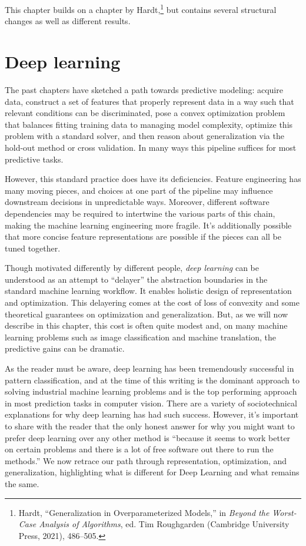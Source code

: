 \documentclass{tufte-book}
\begin{document}
This chapter builds on a chapter by Hardt,\footnote{Hardt,
  {``Generalization in Overparameterized Models,''} in \emph{Beyond the
  Worst-Case Analysis of Algorithms}, ed. Tim Roughgarden (Cambridge
  University Press, 2021), 486--505.} but contains several structural
changes as well as different results.

\chapter{Deep learning}

The past chapters have sketched a path towards predictive modeling:
acquire data, construct a set of features that properly represent data
in a way such that relevant conditions can be discriminated, pose a
convex optimization problem that balances fitting training data to
managing model complexity, optimize this problem with a standard solver,
and then reason about generalization via the hold-out method or cross
validation. In many ways this pipeline suffices for most predictive
tasks.

However, this standard practice does have its deficiencies. Feature
engineering has many moving pieces, and choices at one part of the
pipeline may influence downstream decisions in unpredictable ways.
Moreover, different software dependencies may be required to intertwine
the various parts of this chain, making the machine learning engineering
more fragile. It's additionally possible that more concise feature
representations are possible if the pieces can all be tuned together.

Though motivated differently by different people, \emph{deep learning}
can be understood as an attempt to ``delayer'' the abstraction
boundaries in the standard machine learning workflow. It enables
holistic design of representation and optimization. This delayering
comes at the cost of loss of convexity and some theoretical guarantees
on optimization and generalization. But, as we will now describe in this
chapter, this cost is often quite modest and, on many machine learning
problems such as image classification and machine translation, the
predictive gains can be dramatic.

As the reader must be aware, deep learning has been tremendously
successful in pattern classification, and at the time of this writing is
the dominant approach to solving industrial machine learning problems
and is the top performing approach in most prediction tasks in computer
vision. There are a variety of sociotechnical explanations for why deep
learning has had such success. However, it's important to share with the
reader that the only honest answer for why you might want to prefer deep
learning over any other method is ``because it seems to work better on
certain problems and there is a lot of free software out there to run
the methods.'' We now retrace our path through representation,
optimization, and generalization, highlighting what is different for
Deep Learning and what remains the same.
\end{document}
